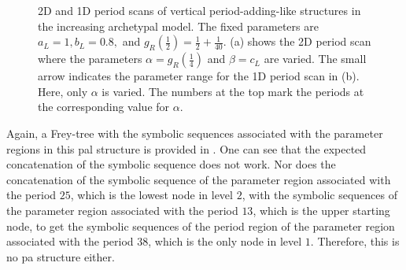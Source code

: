 \begin{figure}
	\centering
	\caption[2D and 1D period scans of vertical period-adding-like structures in the increasing archetypal model]{
		2D and 1D period scans of vertical period-adding-like structures in the increasing archetypal model.
		The fixed parameters are $a_L = 1, b_L = 0.8,$ and $g_R\left(\frac{1}{2}\right) = \frac{1}{2} + \frac{1}{40}$.
		(a) shows the 2D period scan where the parameters $\alpha = g_R\left(\frac{1}{4}\right)$ and $\beta = c_L$ are varied.
		The small arrow indicates the parameter range for the 1D period scan in (b).
		Here, only $\alpha$ is varied.
		The numbers at the top mark the periods at the corresponding value for $\alpha$.
	}
	\label{fig:add.add.like.vert}
\end{figure}

Again, a Frey-tree with the symbolic sequences associated with the parameter regions in this \gls{pal} structure is provided in .
One can see that the expected concatenation of the symbolic sequence does not work.
Nor does the concatenation of the symbolic sequence of the parameter region associated with the period $25$, which is the lowest node in level $2$, with the symbolic sequences of the parameter region associated with the period $13$, which is the upper starting node, to get the symbolic sequences of the period region of the parameter region associated with the period $38$, which is the only node in level $1$.
Therefore, this is no \gls{pa} structure either.

